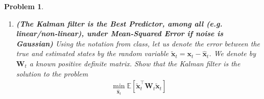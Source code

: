 \documentclass[11pt]{article}
\theoremstyle{plain} %
\newtheorem{problem}[theorem]{Problem}
\newenvironment{solution}
{\color{C2}\normalfont\begin{framed}\begingroup\textbf{Solution:} }
  {\endgroup\end{framed}}
\theoremstyle{remark}
\begin{document}
\begin{problem}
\begin{enumerate}[label=(\alph*)]
\begin{solution}
\begin{align*}
            \mathbf{P}_{t \mid t} :=\left(\mathbf{I}-\mathbf{K}_{t} \mathbf{H}_{t}\right) \mathbf{P}_{t \mid t-1} - \mathbf{K}_{t}\mathbf{M}_{t}^\top, ~~
            \mathbf{K}_{t} :=\mathbf{P}_{t \mid t-1} \mathbf{H}_{t}^\top  + \mathbf{M}_{t}, ~
            \mathbf{S}_{t} :=\mathbf{H}_{t} \mathbf{P}_{t \mid t-1} \mathbf{H}_{t}^\top+\mathbf{R}_{t} + \mathbf{H}_{t}\mathbf{M}_{t} + \mathbf{M}_{t}^\top\mathbf{H}_{t}^\top
          \end{align*}
          Specifically, $\mathbf{K}_{t}$ is called the Kalman gain. Clearly, our belief about
          $\mathbf{x}_{t}$ given $\mathbf{Y}_{t}$ is a multivariate Gaussian distribution.
        \end{solution}

  \item \textbf{(The Kalman filter is the Best Predictor, among all (e.g. linear/non-linear), under Mean-Squared Error if noise is Gaussian)} Using the notation from class, let us denote the error between the true
        and estimated states by the random variable
        $\widetilde{\mathbf{x}}_t=\mathbf{x}_t-\hat{\mathbf{x}}_t$. We denote by
        $\mathbf{W}_t$ a known positive definite matrix. Show that the Kalman filter
        is the solution to the problem
        \begin{align}
          \min_{\hat{\mathbf{x}}_t} \mathbb{E}\left[\widetilde{\mathbf{x}}_t^\top \mathbf{W}_t \widetilde{\mathbf{x}}_t\right]\label{eq: kalman}
        \end{align}


\end{enumerate}
\end{problem}
\end{document}
